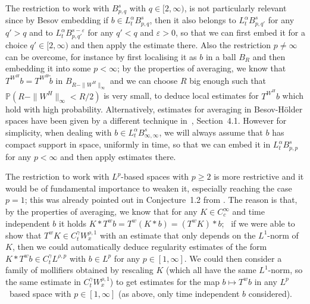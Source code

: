 \documentclass[10pt]{article}
\begin{document}
\begin{remark}
  The restriction to work with $B^s_{p, q}$ with $q \in [2, \infty)$, is not
  particularly relevant since by Besov embedding if $b \in L^{\alpha}_t
  B^s_{p, q}$, then it also belongs to $L^{\alpha}_t B^s_{p, q'}$ for any $q'
  > q$ and to $L^{\alpha}_t B^{s - \varepsilon}_{p, q'}$ for any $q' < q$ and
  $\varepsilon > 0$, so that we can first embed it for a choice $q' \in [2,
  \infty)$ and then apply the estimate there. Also the restriction $p \neq
  \infty$ can be overcome, for instance by first localising it as \~{$b$} in a
  ball $B_R$ and then embedding it into some $p < \infty$; by the properties
  of averaging, we know that $T^{W^H} b = T^{W^H} \tilde{b}$ in $B_{R - \| W^H
  \|_{\infty}}$ and we can choose $R$ big enough such that $\mathbb{P} (R - \|
  W^H \|_{\infty} < R / 2)$ is very small, to deduce local estimates for
  $T^{W^H} b$ which hold with high probability. Alternatively, estimates for
  averaging in Besov-H\"{o}lder spaces have been given by a different
  technique in~{\cite{catelliergubinelli}}, Section~4.1. However for
  simplicity, when dealing with $b \in L^{\alpha}_t B^s_{\infty, \infty}$, we
  will always assume that $b$ has compact support in space, uniformly in time,
  so that we can embed it in $L^{\alpha}_t B^s_{p, p}$ for any $p < \infty$
  and then apply estimates there.
\end{remark}

\begin{remark}
  \label{sec3.3 remark limitation}The restriction to work with
  $L^p$\mbox{-}based spaces with $p \geqslant 2$ is more restrictive and it
  would be of fundamental importance to weaken it, especially reaching the
  case $p = 1$; this was already pointed out in Conjecture~1.2 from
  {\cite{catelliergubinelli}}. The reason is that, by the properties of
  averaging, we know that for any $K \in C^{\infty}_c$ and time independent
  $b$ it holds $K \ast T^w b = T^w (K \ast b) = (T^w K) \ast b$; \ if we were
  able to show that $T^w K \in C^{\gamma}_t W^{\rho, 1}_x$ with an estimate
  that only depends on the $L^1$\mbox{-}norm of $K$, then we could
  automatically deduce regularity estimates of the form $K \ast T^w b \in
  C^{\gamma}_t L^{\rho, p}$ with $b \in L^p$ for any $p \in [1, \infty]$. We
  could then consider a family of mollifiers obtained by rescaling $K$ (which
  all have the same $L^1$\mbox{-}norm, so the same estimate in $C^{\gamma}_t
  W^{\rho, 1}_x$) to get estimates for the map $b \mapsto T^w b$ in any
  $L^p$~based space with $p \in [1, \infty]$ (as above, only time independent
  $b$ considered).
\end{remark}
\end{document}
